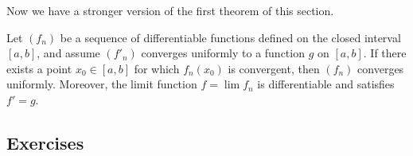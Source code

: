 Now we have a stronger version of the first theorem of this section.

\begin{tcolorbox}
\begin{thm}
    Let \( (f_n)  \) be a sequence of differentiable functions defined on the closed interval \( [a,b]  \), and assume \( (f'_n)  \) converges uniformly to a function \( g  \) on \( [a,b]  \). If there exists a point \( x_0 \in [a,b]  \) for which \( f_n(x_0)  \) is convergent, then \( (f_n)  \) converges uniformly. Moreover, the limit function \( f = \lim f_n  \) is differentiable and satisfies \( f' = g  \).
\end{thm}
\end{tcolorbox}

\subsection{Exercises}

